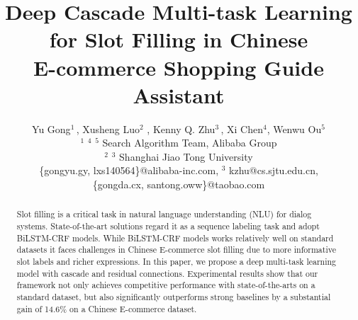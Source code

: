\documentclass{article}
\title{Deep Cascade Multi-task Learning for Slot Filling in Chinese\\ E-commerce Shopping Guide Assistant}
\author{
Yu Gong$^1$\,\footnotemark[1], 
Xusheng Luo$^2$\,\footnotemark[1]\,\footnotemark[2], 
Kenny Q. Zhu$^3$\,\footnotemark[3],
Xi Chen$^4$,
Wenwu Ou$^5$
\\ 
$^1$ $^4$ $^5$ Search Algorithm Team, Alibaba Group \\
$^2$ $^3$ Shanghai Jiao Tong University
\\
\{gongyu.gy, lxs140564\}@alibaba-inc.com,
$^3$ kzhu@cs.sjtu.edu.cn, \\
\{gongda.cx, santong.oww\}@taobao.com
}
\begin{document}
\maketitle

\begin{abstract}
Slot filling is a critical task in natural language understanding
(NLU) for dialog systems.
State-of-the-art solutions regard it as a sequence labeling task 
and adopt BiLSTM-CRF models.
While BiLSTM-CRF models works relatively well on standard datasets 
it faces challenges in Chinese E-commerce slot filling due to 
more informative slot labels and richer expressions.
In this paper, we propose a deep multi-task learning model
with cascade and residual connections.
Experimental results show that our framework 
not only achieves competitive performance with state-of-the-arts
on a standard dataset, but also significantly outperforms
strong baselines by a substantial gain of 14.6\% 
on a Chinese E-commerce dataset.
\end{abstract}

\renewcommand{\thefootnote}{\fnsymbol{footnote}}

\renewcommand{\thefootnote}{\arabic{footnote}}

\begin{CJK}{UTF8}{gbsn}





%









\end{CJK}






\end{document}
